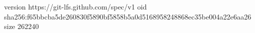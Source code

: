 version https://git-lfs.github.com/spec/v1
oid sha256:f65bbcba5de260830f5890bf5858b5a0d5168958248868ec35be004a22e6aa26
size 262240
